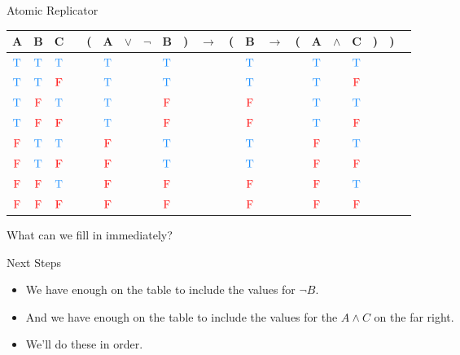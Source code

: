\documentclass[
  ignorenonframetext,
]{beamer}
\providecommand{\tightlist}{%
  \setlength{\itemsep}{0pt}\setlength{\parskip}{0pt}}
\renewcommand{\,}{\text{, }}
\def\True{\textcolor{dodgerblue}{\text{T}}}
\def\False{\textcolor{red}{\text{F}}}
\begin{document}
\begin{frame}{Atomic Replicator}
\protect\hypertarget{atomic-replicator}{}

\begin{center}
\begin{tabular}{@{ }c@{ }@{ }c@{ }@{ }c | c@{ }@{}c@{}@{ }c@{ }@{ }c@{ }@{ }c@{ }@{ }c@{ }@{}c@{}@{ }c@{ }@{}c@{}@{ }c@{ }@{ }c@{ }@{}c@{}@{ }c@{ }@{ }c@{ }@{ }c@{ }@{}c@{}@{}c@{}@{ }c}
A & B & C &  & ( & A & $\vee$ & $\neg$ & B & ) & $\rightarrow$ & ( & B & $\rightarrow$ & ( & A & $\wedge$ & C & ) & ) & \\
\hline 
 $\True$ & $\True$ & $\True$ &  &  & $\True$ &&& $\True$ &  &&  & $\True$ &&  & $\True$ && $\True$ &  &  & \\
 $\True$ & $\True$ & $\False$ &  &  & $\True$ &&& $\True$ &  &&  & $\True$ &&  & $\True$ && $\False$ &  &  & \\
 $\True$ & $\False$ & $\True$ &  &  & $\True$ &&& $\False$ &  &&  & $\False$ &&  & $\True$ && $\True$ &  &  & \\
 $\True$ & $\False$ & $\False$ &  &  & $\True$ &&& $\False$ &  &&  & $\False$ &&  & $\True$ && $\False$ &  &  & \\
 $\False$ & $\True$ & $\True$ &  &  & $\False$ &&& $\True$ &  &&  & $\True$ &&  & $\False$ && $\True$ &  &  & \\
 $\False$ & $\True$ & $\False$ &  &  & $\False$ &&& $\True$ &  &&  & $\True$ &&  & $\False$ && $\False$ &  &  & \\
 $\False$ & $\False$ & $\True$ &  &  & $\False$ &&& $\False$ &  &&  & $\False$ &&  & $\False$ && $\True$ &  &  & \\
 $\False$ & $\False$ & $\False$ &  &  & $\False$ &&& $\False$ &  &&  & $\False$ &&  & $\False$ && $\False$ &  &  & \\
\end{tabular}
\bigskip
\end{center}

What can we fill in immediately?

\end{frame}

\begin{frame}{Next Steps}
\protect\hypertarget{next-steps}{}

\begin{itemize}
\tightlist
\item
  We have enough on the table to include the values for \(\neg B\).
\item
  And we have enough on the table to include the values for the
  \(A \wedge C\) on the far right.
\item
  We'll do these in order.
\end{itemize}

\end{frame}
\end{document}
